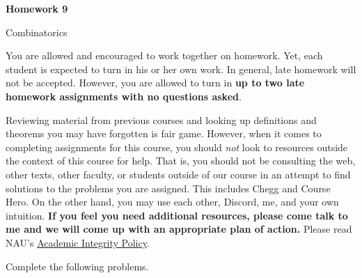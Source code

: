 \documentclass[11pt]{article}%
\theoremstyle{definition}
\newcommand{\blankline}{\pagebreak[2]\vspace{.5\baselineskip}}
\begin{document}
\begin{center}
{\Large\bf Homework 9}

\smallskip

Combinatorics
\end{center}

\thispagestyle{fancy}

You are allowed and encouraged to work together on homework. Yet, each student is expected to turn in his or her own work. In general, late homework will not be accepted. However, you are allowed to turn in \textbf{up to two late homework assignments with no questions asked}. 

\blankline

Reviewing material from previous courses and looking up definitions and theorems you may have forgotten is fair game. However, when it comes to completing assignments for this course, you should \emph{not} look to resources outside the context of this course for help.  That is, you should not be consulting the web, other texts, other faculty, or students outside of our course in an attempt to find solutions to the problems you are assigned.  This includes Chegg and Course Hero. On the other hand, you may use each other, Discord, me, and your own intuition. \textbf{If you feel you need additional resources, please come talk to me and we will come up with an appropriate plan of action.} Please read NAU's \href{https://www5.nau.edu/policies/Client/Details/828?whoIsLooking=Students&pertainsTo=All&sortDirection=Ascending&page=1}{Academic Integrity Policy}.

\blankline

Complete the following problems. 
\end{document}
